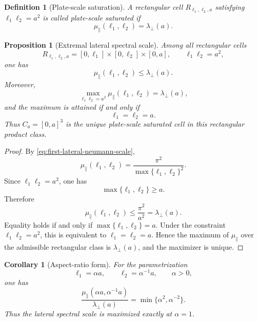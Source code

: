 \documentclass[11pt]{article}
\newtheorem{proposition}[theorem]{Proposition}
\newtheorem{corollary}[theorem]{Corollary}
\newtheorem{definition}[theorem]{Definition}
\begin{document}
\begin{definition}[Plate-scale saturation]
\label{def:plate-scale-saturation}
A rectangular cell \(R_{\ell_1,\ell_2,a}\) satisfying
\(\ell_1\ell_2=a^2\) is called plate-scale saturated if
\begin{equation}
    \mu_\parallel(\ell_1,\ell_2)=\lambda_\perp(a).
    \label{eq:plate-scale-saturation}
\end{equation}
\end{definition}

\begin{proposition}[Extremal lateral spectral scale]
\label{prop:spectral-selection-cube}
Among all rectangular cells
\[
    R_{\ell_1,\ell_2,a}
    =
    [0,\ell_1]\times[0,\ell_2]\times[0,a],
    \qquad
    \ell_1\ell_2=a^2,
\]
one has
\begin{equation}
    \mu_\parallel(\ell_1,\ell_2)
    \leq
    \lambda_\perp(a).
    \label{eq:lateral-gap-upper-bound}
\end{equation}
Moreover,
\begin{equation}
    \max_{\ell_1\ell_2=a^2}\mu_\parallel(\ell_1,\ell_2)
    =
    \lambda_\perp(a),
    \label{eq:max-lateral-gap}
\end{equation}
and the maximum is attained if and only if
\begin{equation}
    \ell_1=\ell_2=a.
    \label{eq:cube-equality-condition}
\end{equation}
Thus \(C_a=[0,a]^3\) is the unique plate-scale saturated cell in this
rectangular product class.
\end{proposition}

\begin{proof}
By \eqref{eq:first-lateral-neumann-scale},
\[
    \mu_\parallel(\ell_1,\ell_2)
    =
    \frac{\pi^2}{\max\{\ell_1,\ell_2\}^2}.
\]
Since \(\ell_1\ell_2=a^2\), one has
\[
    \max\{\ell_1,\ell_2\}\geq a.
\]
Therefore
\[
    \mu_\parallel(\ell_1,\ell_2)
    \leq
    \frac{\pi^2}{a^2}
    =
    \lambda_\perp(a).
\]
Equality holds if and only if
\(\max\{\ell_1,\ell_2\}=a\).  Under the constraint
\(\ell_1\ell_2=a^2\), this is equivalent to
\(\ell_1=\ell_2=a\).  Hence the maximum of
\(\mu_\parallel\) over the admissible rectangular class is
\(\lambda_\perp(a)\), and the maximizer is unique.
\end{proof}

\begin{corollary}[Aspect-ratio form]
\label{cor:aspect-ratio-gap}
For the parametrization
\[
    \ell_1=\alpha a,
    \qquad
    \ell_2=\alpha^{-1}a,
    \qquad
    \alpha>0,
\]
one has
\begin{equation}
    \frac{\mu_\parallel(\alpha a,\alpha^{-1}a)}
         {\lambda_\perp(a)}
    =
    \min\{\alpha^2,\alpha^{-2}\}.
    \label{eq:aspect-ratio-gap-ratio}
\end{equation}
Thus the lateral spectral scale is maximized exactly at
\(\alpha=1\).
\end{corollary}
\end{document}
